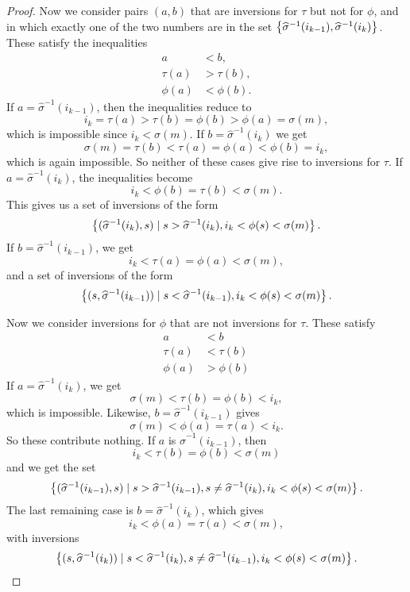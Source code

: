 \begin{proof}
  Now we consider
  pairs $(a,b)$ that are inversions for $\tau$ but not for $\phi$, and
  in which exactly one of the two numbers are in the set
  $\left\{ \widehat{\sigma}^{-1}(i_{k-1}),\widehat{\sigma}^{-1}(i_{k}) \right\}$.
  These satisfy the inequalities
  \begin{align*}
    a &< b, \\
    \tau(a) &> \tau(b), \\
    \phi(a) &< \phi(b).
  \end{align*}
  If $a = \widehat{\sigma}^{-1}(i_{k-1})$, then the inequalities
  reduce to
  \[ i_k = \tau(a) > \tau(b) = \phi(b) > \phi(a) = \sigma(m), \]
  which is impossible since $i_k < \sigma(m)$.
  If $b = \widehat{\sigma}^{-1}(i_{k})$ we get
  \[ \sigma(m) = \tau(b) < \tau(a) = \phi(a) < \phi(b) = i_k, \]
  which is again impossible. So neither of these cases give rise to
  inversions for $\tau$.
  If $a = \widehat{\sigma}^{-1}(i_{k})$, the inequalities become
  \[ i_k < \phi(b) = \tau(b) < \sigma(m). \]
  This gives us a set of inversions of the form
  \[ \left\{ (\widehat{\sigma}^{-1}(i_{k}),s) \mid s >
    \widehat{\sigma}^{-1}(i_{k}), i_k < \phi(s) < \sigma(m) \right\}. \]
  If $b = \widehat{\sigma}^{-1}(i_{k-1})$, we get
  \[ i_k < \tau(a) = \phi(a) < \sigma(m), \]
  and a set of inversions of the form
  \[ \left\{ (s,\widehat{\sigma}^{-1}(i_{k-1})) \mid s <
    \widehat{\sigma}^{-1}(i_{k-1}), i_k < \phi(s) < \sigma(m) \right\}. \]

  Now we consider inversions for $\phi$ that are not inversions for
  $\tau$. These satisfy
  \begin{align*}
    a &< b \\
    \tau(a) &< \tau(b) \\
    \phi(a) &> \phi(b)
  \end{align*}
  If $a = \widehat{\sigma}^{-1}(i_{k})$, we get
  \[ \sigma(m) < \tau(b) = \phi(b) < i_k, \]
  which is impossible. Likewise, $b = \widehat{\sigma}^{-1}(i_{k-1})$
  gives
  \[ \sigma(m) < \phi(a) = \tau(a) < i_k. \]
  So these contribute nothing. If $a$ is
  $\widehat{\sigma}^{-1}(i_{k-1})$, then
  \[ i_k < \tau(b) = \phi(b) < \sigma(m) \]
  and we get the set
  \[ \left\{ (\widehat{\sigma}^{-1}(i_{k-1}),s) \mid s >
    \widehat{\sigma}^{-1}(i_{k-1}), s \neq
    \widehat{\sigma}^{-1}(i_{k}), i_k < \phi(s) < \sigma(m) \right\}. \]
  The last remaining case is $b = \widehat{\sigma}^{-1}(i_{k})$, which
  gives
  \[ i _k < \phi(a) = \tau(a) < \sigma(m), \]
  with inversions
  \[ \left\{  (s,\widehat{\sigma}^{-1}(i_{k})) \mid s <
    \widehat{\sigma}^{-1}(i_{k}), s \neq
    \widehat{\sigma}^{-1}(i_{k-1}), i_k < \phi(s) < \sigma(m)  \right\}. \]
  

\end{proof}
